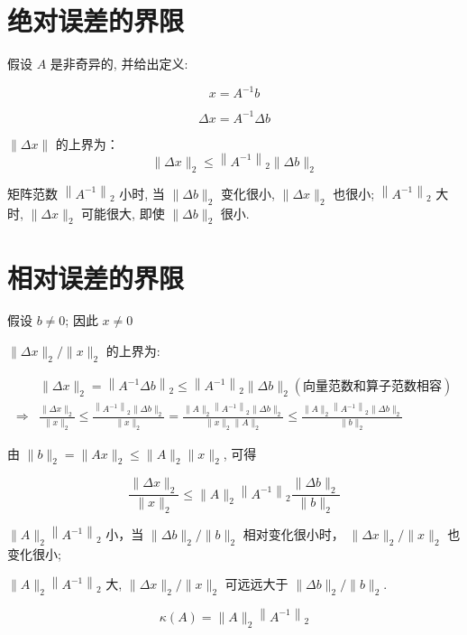 \section{绝对误差的界限}

假设 $ A $ 是非奇异的, 并给出定义:

\begin{notation}
    $$ x=A^{-1} b$$ 
    
    $$ \Delta x=A^{-1} \Delta b $$
\end{notation}

$ \|\Delta x\| $ 的上界为：
$$
\|\Delta x\|_{2} \leq\left\|A^{-1}\right\|_{2}\|\Delta b\|_{2}
$$

矩阵范数 $ \left\|A^{-1}\right\|_{2} $ 小时, 当 $ \|\Delta b\|_{2} $ 变化很小, $ \|\Delta x\|_{2} $ 也很小; $ \left\|A^{-1}\right\|_{2} $ 大时,  $ \|\Delta x\|_{2} $ 可能很大,  即使 $ \|\Delta b\|_{2} $ 很小. 

\section{相对误差的界限}

假设 $ b \neq 0 $; 因此 $ x \neq 0$

$\|\Delta x\|_{2} /\|x\|_{2} $ 的上界为:

$$ 
\begin{aligned}
    &\|\Delta x\|_{2}=\left\|A^{-1} \Delta b\right\|_{2} \leq\left\|A^{-1}\right\|_{2}\|\Delta b\|_{2}(向量范数和算子范数相容)\\
    \Rightarrow& \frac{\|\Delta x\|_{2}}{\|x\|_{2}} \leq \frac{\left\|A^{-1}\right\|_{2}\|\Delta b\|_{2}}{\|x\|_{2}}=\frac{\|A\|_{2}\left\|A^{-1}\right\|_{2}\|\Delta b\|_{2}}{\|x\|_{2}\|A\|_{2}} \leq \frac{\|A\|_{2}\left\|A^{-1}\right\|_{2}\|\Delta b\|_{2}}{\|b\|_{2}}
\end{aligned}
$$

由 $ \|b\|_{2}=\|A x\|_{2} \leq\|A\|_{2}\|x\|_{2} $, 可得

$$ \frac{\|\Delta x\|_{2}}{\|x\|_{2}} \leq\|A\|_{2}\left\|A^{-1}\right\|_{2} \frac{\|\Delta b\|_{2}}{\|b\|_{2}} $$

$ \|A\|_{2}\left\|A^{-1}\right\|_{2} $ 小，当 $ \|\Delta b\|_{2} /\|b\|_{2} $ 相对变化很小时， $ \|\Delta x\|_{2} /\|x\|_{2} $ 也 变化很小;

$ \|A\|_{2}\left\|A^{-1}\right\|_{2} $ 大, $ \|\Delta x\|_{2} /\|x\|_{2} $ 可远远大于 $ \|\Delta b\|_{2} /\|b\|_{2} $.


\begin{definition}
    $$ \kappa(A)=\|A\|_{2}\left\|A^{-1}\right\|_{2} $$
\end{definition}

